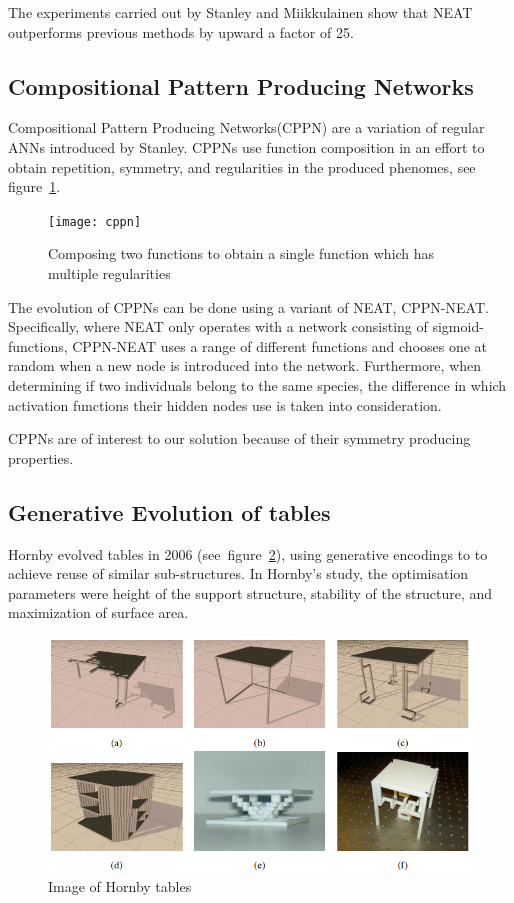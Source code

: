 The experiments carried out by Stanley and Miikkulainen show that NEAT 
outperforms previous methods by upward a factor of 
25\cite[p.~2]{stanley2002evolving}.
\subsection{Compositional Pattern Producing Networks}
\label{sec:cppn}
Compositional Pattern Producing Networks(CPPN) are a variation of regular ANNs 
introduced by 
Stanley\cite{Stanley2007}.
CPPNs use function composition in an effort to obtain repetition, symmetry, and 
regularities in the produced phenomes, see figure~\ref{fig:cppn}.
\begin{figure}[ht]
\centering
\texttt{[image: cppn]}
\caption{Composing two functions to obtain a single function which has multiple 
regularities \cite{Stanley2007}}
\label{fig:cppn}
\end{figure}

The evolution of CPPNs can be done using a variant of NEAT, 
CPPN-NEAT.
Specifically, where NEAT only operates with a network consisting of 
sigmoid-functions, CPPN-NEAT uses a range of different functions and chooses 
one at random when a new node is introduced into the network.
Furthermore, when determining if two individuals belong to the same species, 
the difference in which activation functions their hidden nodes use is taken 
into consideration.

CPPNs are of interest to our solution because of their symmetry producing 
properties.

\subsection{Generative Evolution of tables}
Hornby evolved tables in 2006 (see~figure~\ref{fig:hornby_tables}), using
generative encodings to to achieve reuse of similar sub-structures.
In Hornby's study, the optimisation parameters were height of the support
structure, stability of the structure, and maximization of surface area.
\begin{figure}[ht]
\includegraphics[scale=.6]{content/img/tables}
\caption{Image of Hornby tables\cite{paper:ev4}}
\label{fig:hornby_tables}
\end{figure}

